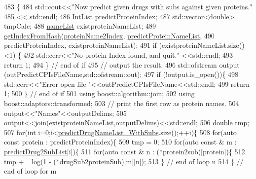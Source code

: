 \begin{DoxyCode}
483                                       \{
484     std::cout<<\textcolor{stringliteral}{"Now predict given drugs with subs against given proteins."}
485              << std::endl;
486     \hyperlink{namespacegift_a786390fe70b2e3b6d61dba1014651f03}{IntList} predictProteinIndex;
487     std::vector<double> tmpCalc;
488     \hyperlink{namespacegift_a62f85efaab3bff48335863ae0670c7a7}{nameList} existproteinNameList;
489     \hyperlink{namespacegift_a835110af070bdfb37d092c6a7f79d65c}{getIndexFromHash}(\hyperlink{namespacegift_ad49c613c81da3c4189ea4f16915c60c5}{proteinName2Index}, 
      \hyperlink{namespacegift_a03bb78fc438e2b1af29ff3b46b70a085}{predictProteinNameList},
490                      predictProteinIndex, existproteinNameList);
491     \textcolor{keywordflow}{if} (existproteinNameList.size()<1) \{
492       std::cerr<<\textcolor{stringliteral}{"No protein Index found, and quit."} <<std::endl;
493       \textcolor{keywordflow}{return} 1;
494     \} \textcolor{comment}{// end of if}
495     \textcolor{comment}{// output the result.}
496     std::ofstream output (outPredictCPIsFileName,std::ofstream::out);
497     \textcolor{keywordflow}{if} (!output.is\_open())\{
498       std::cerr<<\textcolor{stringliteral}{"Error open file "}<<outPredictCPIsFileName<<std::endl;
499       \textcolor{keywordflow}{return} 1;
500     \} \textcolor{comment}{// end of if}
501     \textcolor{keyword}{using} boost::algorithm::join;
502     \textcolor{keyword}{using} boost::adaptors::transformed;
503     \textcolor{comment}{// print the first row as protein names.}
504     output<<\textcolor{stringliteral}{"Names"}<<outputDelims;
505     output<<join(existproteinNameList,outputDelims)<<std::endl;
506     \textcolor{keywordtype}{double} tmp;
507     \textcolor{keywordflow}{for}(\textcolor{keywordtype}{int} i=0;i<\hyperlink{namespacegift_a85bd1982c5b60a7cf09a0f80398bb051}{predictDrugNameList\_WithSubs}.size();++i)\{
508       \textcolor{keywordflow}{for}(\textcolor{keyword}{auto} \textcolor{keyword}{const} protein : predictProteinIndex)\{
509         tmp = 0;
510         \textcolor{keywordflow}{for}(\textcolor{keyword}{auto} \textcolor{keyword}{const} & m : \hyperlink{namespacegift_a00bda5cc17262f36063eed0fbf03459c}{predictDrug2SubList}[i])\{
511           \textcolor{keywordflow}{for}(\textcolor{keyword}{auto} \textcolor{keyword}{const} & n : (*protein2sub)[protein])\{
512             tmp += log(1 - (*drugSub2proteinSub)[m][n]);
513           \} \textcolor{comment}{// end of loop n}
514         \} \textcolor{comment}{// end of loop for m}

\end{DoxyCode}

